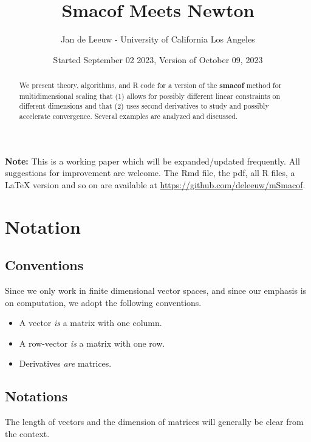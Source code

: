 \documentclass[
  12pt,
]{article}
\title{Smacof Meets Newton}
\author{Jan de Leeuw - University of California Los Angeles}
\date{Started September 02 2023, Version of October 09, 2023}
\providecommand{\tightlist}{%
  \setlength{\itemsep}{0pt}\setlength{\parskip}{0pt}}
\begin{document}
\maketitle
\begin{abstract}
We present theory, algorithms, and R code for a version of the \textbf{smacof} method for multidimensional scaling that (1) allows for possibly different linear constraints on different dimensions and that (2) uses second derivatives to study and possibly accelerate convergence. Several examples are analyzed and discussed.
\end{abstract}

{
\setcounter{tocdepth}{4}
\tableofcontents
}
\textbf{Note:} This is a working paper which will be expanded/updated frequently. All suggestions for improvement are welcome. The Rmd file, the pdf, all R files, a LaTeX version and so on are available at \url{https://github.com/deleeuw/mSmacof}.

\section*{Notation}\label{notation}

\subsection*{Conventions}\label{conventions}

Since we only work in finite dimensional vector spaces, and since our emphasis is on computation, we adopt the following conventions.

\begin{itemize}
\tightlist
\item
  A vector \emph{is} a matrix with one column.
\item
  A row-vector \emph{is} a matrix with one row.
\item
  Derivatives \emph{are} matrices.
\end{itemize}

\subsection*{Notations}\label{notations}

The length of vectors and the dimension of matrices will generally
be clear from the context.
\end{document}
